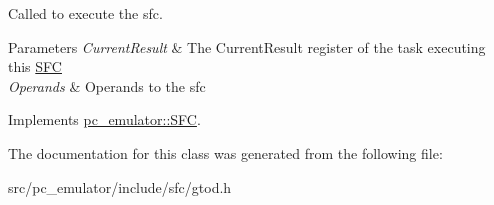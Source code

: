 Called to execute the sfc. 


\begin{DoxyParams}{Parameters}
{\em Current\+Result} & The Current\+Result register of the task executing this \hyperlink{classpc__emulator_1_1SFC}{S\+FC} \\
\hline
{\em Operands} & Operands to the sfc \\
\hline
\end{DoxyParams}


Implements \hyperlink{classpc__emulator_1_1SFC_ab206c80fc0e429c56672b4f6a0ca8635}{pc\+\_\+emulator\+::\+S\+FC}.



The documentation for this class was generated from the following file\+:\begin{DoxyCompactItemize}
\item 
src/pc\+\_\+emulator/include/sfc/gtod.\+h\end{DoxyCompactItemize}
